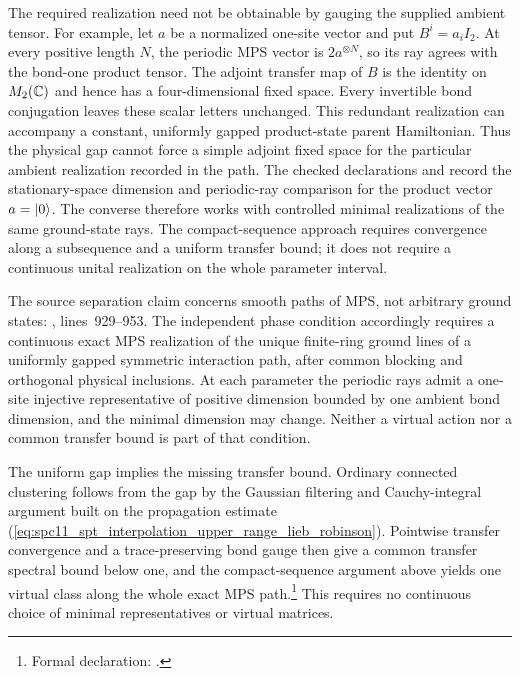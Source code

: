 \documentclass{article}
\begin{document}
The required realization need not be obtainable by gauging the supplied
ambient tensor. For example, let $a$ be a normalized one-site vector and
put $B^i=a_iI_2$. At every positive length $N$, the periodic MPS vector is
$2a^{\otimes N}$, so its ray agrees with the bond-one product tensor.
The adjoint transfer map of $B$ is the identity on $M_2(\mathbb{C})$ and hence has
a four-dimensional fixed space. Every invertible bond conjugation leaves
these scalar letters unchanged. This redundant realization can accompany
a constant, uniformly gapped product-state parent Hamiltonian. Thus the
physical gap cannot force a simple adjoint fixed space for the particular
ambient realization recorded in the path. The checked declarations
 and
 record the
stationary-space dimension and periodic-ray comparison for the product
vector $a=|0\rangle$. The converse therefore works with controlled minimal realizations of the
same ground-state rays. The compact-sequence approach requires convergence
along a subsequence and a uniform transfer bound; it does not require a
continuous unital realization on the whole parameter interval.

The source separation claim concerns smooth paths of MPS, not arbitrary
ground states: , lines~929--953. The
independent phase condition accordingly requires a continuous exact MPS
realization of the unique finite-ring ground lines of a uniformly gapped
symmetric interaction path, after common blocking and orthogonal physical
inclusions. At each parameter the periodic rays admit a one-site injective
representative of positive dimension bounded by one ambient bond dimension,
and the minimal dimension may change. Neither a virtual action nor a common
transfer bound is part of that condition.

The uniform gap implies the missing transfer bound. Ordinary connected
clustering follows from the gap by the Gaussian filtering and Cauchy-integral
argument built on the propagation estimate
(\ref{eq:spc11_spt_interpolation_upper_range_lieb_robinson}). Pointwise
transfer convergence and a trace-preserving bond gauge then give a common
transfer spectral bound below one, and the compact-sequence argument above
yields one virtual class along the whole exact MPS path.\footnote{Formal
    declaration: .}
This requires no continuous choice of minimal representatives or virtual
matrices.
\end{document}
